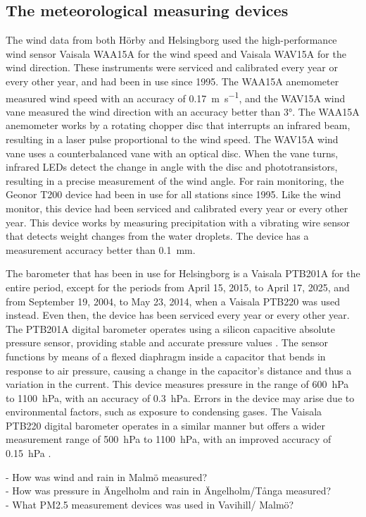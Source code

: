 \subsection{The meteorological measuring devices}
The wind data from both Hörby and Helsingborg used the high-performance wind sensor Vaisala WAA15A for the wind speed and Vaisala WAV15A for the wind direction. These instruments were serviced and calibrated every year or every other year, and had been in use since 1995. The WAA15A anemometer measured wind speed with an accuracy of \SI{0.17}{\m\per\s}, and the WAV15A wind vane measured the wind direction with an accuracy better than \ang{3}\cite{vaisalaWindSetWA152021}. The WAA15A anemometer works by a rotating chopper disc that interrupts an infrared beam, resulting in a laser pulse proportional to the wind speed. The WAV15A wind vane uses a counterbalanced vane with an optical disc. When the vane turns, infrared LEDs detect the change in angle with the disc and phototransistors, resulting in a precise measurement of the wind angle. For rain monitoring, the Geonor T200 device had been in use for all stations since 1995. Like the wind monitor, this device had been serviced and calibrated every year or every other year. This device works by measuring precipitation with a vibrating wire sensor that detects weight changes from the water droplets\cite{geonorinc.T200BSeriesAll2019}. The device has a measurement accuracy better than \SI{0.1}{\mm}.

The barometer that has been in use for Helsingborg is a Vaisala PTB201A for the entire period, except for the periods from April 15, 2015, to April 17, 2025, and from September 19, 2004, to May 23, 2014, when a Vaisala PTB220 was used instead. Even then, the device has been serviced every year or every other year. The PTB201A digital barometer operates using a silicon capacitive absolute pressure sensor, providing stable and accurate pressure values \cite{vaisalaPTB200DIGITAL1993}. The sensor functions by means of a flexed diaphragm inside a capacitor that bends in response to air pressure, causing a change in the capacitor’s distance and thus a variation in the current. This device measures pressure in the range of \SI{600}{\hecto\pascal} to \SI{1100}{\hecto\pascal}, with an accuracy of \SI{0.3}{\hecto\pascal}. Errors in the device may arise due to environmental factors, such as exposure to condensing gases. The Vaisala PTB220 digital barometer operates in a similar manner but offers a wider measurement range of \SI{500}{\hecto\pascal} to \SI{1100}{\hecto\pascal}, with an improved accuracy of \SI{0.15}{\hecto\pascal} \cite{vaisalaPTB220SeriesDigital2001}.


- How was wind and rain in Malmö measured? \\
- How was pressure in Ängelholm  and rain in Ängelholm/Tånga measured? \\
- What PM2.5 measurement devices was used in Vavihill/ Malmö? 
